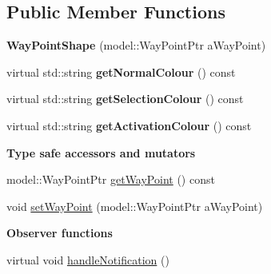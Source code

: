 \subsection*{Public Member Functions}
\begin{DoxyCompactItemize}
\item 
{\bfseries Way\+Point\+Shape} (model\+::\+Way\+Point\+Ptr a\+Way\+Point)\hypertarget{class_view_1_1_way_point_shape_a580fc67d3d92b31572b783ad31fdc523}{}\label{class_view_1_1_way_point_shape_a580fc67d3d92b31572b783ad31fdc523}

\item 
virtual std\+::string {\bfseries get\+Normal\+Colour} () const \hypertarget{class_view_1_1_way_point_shape_adf7ab3f773081c4797f9e9e9aa2a0e6e}{}\label{class_view_1_1_way_point_shape_adf7ab3f773081c4797f9e9e9aa2a0e6e}

\item 
virtual std\+::string {\bfseries get\+Selection\+Colour} () const \hypertarget{class_view_1_1_way_point_shape_a94efb36c66c4ef2ac2bd8a7130abb11c}{}\label{class_view_1_1_way_point_shape_a94efb36c66c4ef2ac2bd8a7130abb11c}

\item 
virtual std\+::string {\bfseries get\+Activation\+Colour} () const \hypertarget{class_view_1_1_way_point_shape_a768899743f4d76d0f6c907db9234823c}{}\label{class_view_1_1_way_point_shape_a768899743f4d76d0f6c907db9234823c}

\end{DoxyCompactItemize}
\begin{Indent}{\bf Type safe accessors and mutators}\par
\begin{DoxyCompactItemize}
\item 
model\+::\+Way\+Point\+Ptr \hyperlink{class_view_1_1_way_point_shape_ad5ae425bed0688bd0d51f5ddbc8d4dc1}{get\+Way\+Point} () const
\item 
void \hyperlink{class_view_1_1_way_point_shape_ad75feefcec15d7c2ea7de8d1fea71fe9}{set\+Way\+Point} (model\+::\+Way\+Point\+Ptr a\+Way\+Point)
\end{DoxyCompactItemize}
\end{Indent}
\begin{Indent}{\bf Observer functions}\par
\begin{DoxyCompactItemize}
\item 
virtual void \hyperlink{class_view_1_1_way_point_shape_a84f786f8027e91441c8197cdb56b3d5f}{handle\+Notification} ()
\end{DoxyCompactItemize}
\end{Indent}
